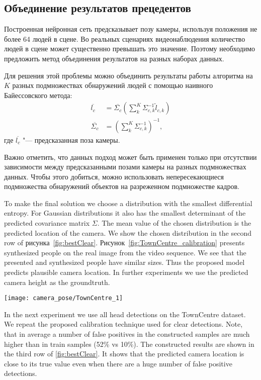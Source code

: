 \subsection{Объединение результатов прецедентов}

Построенная нейронная сеть предсказывает позу камеры, используя положения не более 64 людей в сцене. Во реальных сценариях видеонаблюдения количество людей в сцене может существенно превышать это значение. Поэтому необходимо предложить метод объединения результатов на разных наборах данных.

Для решения этой проблемы можно объединить результаты работы алгоритма на $K$ разных подмножествах обнаружений людей с помощью наивного Байессовского метода:
\begin{align}
	\overline{l_c} &= \overline{\Sigma_c} \left( \sum_k^K{\Sigma_{c,k}^{-1} \tilde{l}_{c,k} } \right) \\
	\overline{\Sigma_c} &= \left( \sum_k^K \Sigma_{c,k}^{-1} \right) ^ {-1},
\end{align}
где $\overline{l_c}$ "--- предсказанная поза камеры.

Важно отметить, что данных подход может быть применен только при отсутствии зависимости между предсказанными позами камеры на разных подмножествах данных. Чтобы этого добиться, можно использовать непересекающиеся подмножества обнаружений объектов на разреженном подмножестве кадров.

To make the final solution we choose a distribution with the smallest differential entropy. For Gaussian distributions it also has the smallest determinant of the predicted covariance matrix $\Sigma$. The mean value of the chosen distribution is the predicted location of the camera. We show the chosen distribution in the second row of рисунка~\ref{fig:bestClear}. Рисунок~\ref{fig:TownCentre_calibration} presents synthesized people on the real image from the video sequence. We see that the presented and synthesized people have similar sizes. Thus the proposed model predicts plausible camera location. In further experiments we use the predicted camera height as the groundtruth.

\begin{figure*}[!t]
	\centering
	\texttt{[image: camera\_pose/TownCentre\_1]}
	\caption{Визуализация синтезированных людей на предсказанной плоскости земли.}
	\label{fig:TownCentre_calibration}
\end{figure*}

In the next experiment we use all head detections on the TownCentre dataset. We repeat the proposed calibration technique used for clear detections. Note, that in average a number of false positives in the constructed samples are much higher than in train samples (52\% vs 10\%). The constructed results are shown in the third row of \ref{fig:bestClear}. It shows that the predicted camera location is close to its true value even when there are a huge number of false positive detections.

